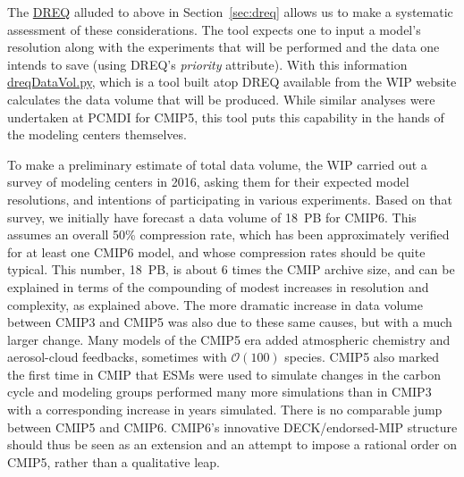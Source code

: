 \documentclass[gmd,manuscript]{copernicus}
\newcommand{\secref}[1] {\mbox{Section  \ref{sec:#1}}}
\begin{document}
The \href{https://goo.gl/iNBQ9m}{DREQ} alluded to above in
\secref{dreq} allows us to make a systematic assessment of these
considerations. The tool expects one to input a model's resolution
along with the experiments that will be performed and the data one
intends to save (using DREQ's \emph{priority} attribute). With this
information
\href{https://goo.gl/Ezz5v3}{dreqDataVol.py}, which is a tool 
built atop DREQ available from the WIP website calculates the
data volume that will be produced. While similar
analyses were undertaken at PCMDI for CMIP5, this tool puts this
capability in the hands of the modeling centers themselves.

To make a preliminary estimate of total data volume, the WIP carried
out a survey of modeling centers in 2016, asking them for their
expected model resolutions, and intentions of participating in various
experiments. Based on that survey, we initially have forecast a data
volume of 18~PB for CMIP6. This assumes an overall 50\% compression
rate, which has been approximately verified for at least one CMIP6
model, and whose compression rates should be quite typical. This
number, 18~PB, is about 6 times the CMIP archive size, and can be
explained in terms of the compounding of modest increases in
resolution and complexity, as explained above. The more dramatic
increase in data volume between CMIP3 and CMIP5 was also due to these
same causes, but with a much larger change. Many models of the CMIP5
era added atmospheric chemistry and aerosol-cloud feedbacks, sometimes
with $\mathcal{O}(100)$ species. CMIP5 also marked the first time in
CMIP that ESMs were used to simulate changes in the carbon cycle and
modeling groups performed many more simulations than in CMIP3 with a
corresponding increase in years simulated. There is no comparable jump
between CMIP5 and CMIP6. CMIP6's innovative DECK/endorsed-MIP
structure should thus be seen as an extension and an attempt to impose
a rational order on CMIP5, rather than a qualitative leap.
\end{document}
